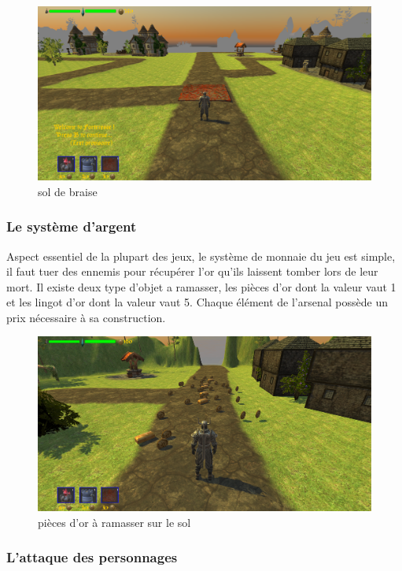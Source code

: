 \documentclass[a4paper, 12pt]{article}
\begin{document}
	\begin{figure}[!ht]
		\centerline{\includegraphics[scale=0.3]{lavafloor.png}}
		\caption*{sol de braise}
	\end{figure}		
		\subsubsection{Le système d’argent}
		Aspect essentiel de la plupart des jeux, le système de monnaie du jeu est simple, il faut tuer des ennemis pour récupérer l’or qu’ils laissent tomber lors de leur mort. Il existe deux type d’objet a ramasser, les pièces d’or dont la valeur vaut 1 et les lingot d’or dont la valeur vaut 5. Chaque élément de l’arsenal possède un prix nécessaire à sa construction.
	\begin{figure}[!ht]	
		\centerline{\includegraphics[scale=0.3]{gold.png}}	
		\caption*{pièces d'or à ramasser sur le sol}	
	\end{figure}
		
		\subsubsection{L’attaque des personnages}
	
\end{document}
